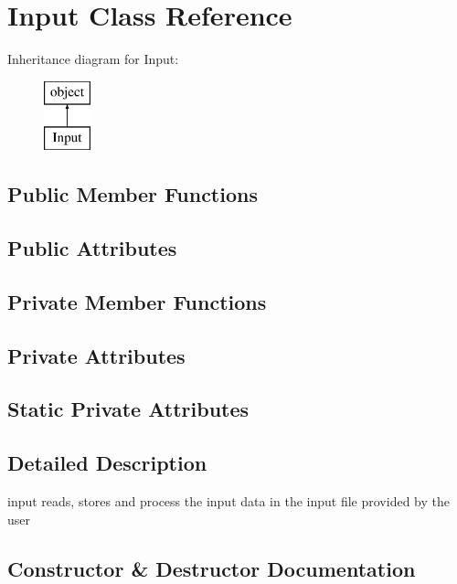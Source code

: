 \hypertarget{classopenbu_1_1input_1_1_input}{}\section{Input Class Reference}
\label{classopenbu_1_1input_1_1_input}
Inheritance diagram for Input\+:\begin{figure}[H]
\begin{center}
\leavevmode
\includegraphics[height=2.000000cm]{classopenbu_1_1input_1_1_input}
\end{center}
\end{figure}
\subsection*{Public Member Functions}
\subsection*{Public Attributes}
\subsection*{Private Member Functions}
\subsection*{Private Attributes}
\subsection*{Static Private Attributes}


\subsection{Detailed Description}
\begin{DoxyVerb}input reads, stores and process the input data in the input file provided by the user\end{DoxyVerb}
 

\subsection{Constructor \& Destructor Documentation}
\mbox{\label{classopenbu_1_1input_1_1_input_a328e9f10fa4fe11e993f29a999115074}} 
